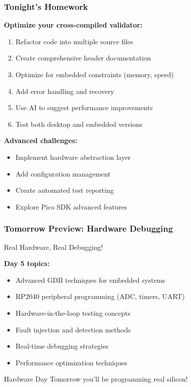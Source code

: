 \documentclass{beamer}
\begin{document}
\begin{frame}
\frametitle{Tonight's Homework}
\textbf{Optimize your cross-compiled validator:}
\begin{enumerate}
    \item Refactor code into multiple source files
    \item Create comprehensive header documentation
    \item Optimize for embedded constraints (memory, speed)
    \item Add error handling and recovery
    \item Use AI to suggest performance improvements
    \item Test both desktop and embedded versions
\end{enumerate}

\vspace{0.5cm}
\textbf{Advanced challenges:}
\begin{itemize}
    \item Implement hardware abstraction layer
    \item Add configuration management
    \item Create automated test reporting
    \item Explore Pico SDK advanced features
\end{itemize}
\end{frame}

\begin{frame}
\frametitle{Tomorrow Preview: Hardware Debugging}
\begin{center}
\Large Real Hardware, Real Debugging!
\end{center}

\textbf{Day 5 topics:}
\begin{itemize}
    \item Advanced GDB techniques for embedded systems
    \item RP2040 peripheral programming (ADC, timers, UART)
    \item Hardware-in-the-loop testing concepts
    \item Fault injection and detection methods
    \item Real-time debugging strategies
    \item Performance optimization techniques
\end{itemize}

\vspace{0.5cm}
\begin{alertblock}{Hardware Day}
Tomorrow you'll be programming real silicon!
\end{alertblock}
\end{frame}
\end{document}
